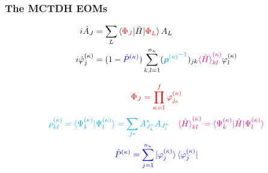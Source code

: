 \documentclass{beamer}
\begin{document}
\begin{frame}
  \frametitle{The MCTDH EOMs}
 \vspace{-.3cm}
\begin{block}{}
\begin{align}
\begin{split}
i\dot{A}_J &= \sum_L \braket{\textcolor{red}{\Phi_J}|\hat{H}|\textcolor{red}{\Phi_L}}A_L \\
i\dot{\varphi}^{(\kappa)}_j &= (1 - \textcolor{blue}{\hat{P}^{(\kappa)}})\sum_{k,l=1}^{n_{\kappa}}(\textcolor{cyan}{{\bm{\rho}^{(\kappa)}}^{-1}})_{jk}\textcolor{magenta}{\braket{\hat{H}}_{kl}^{(\kappa)}}\varphi^{(\kappa)}_l
\label{mctdh_eom}
\end{split}	
\end{align}
\end{block}
 \vspace{-.35cm}
\begin{equation}
\textcolor{red}{\Phi_J = \prod_{\kappa=1}^f\varphi_{j_{\kappa}}^{(\kappa)}}
\end{equation}
\begin{equation}
\textcolor{cyan}{\rho_{kl}^{(\kappa)} = \braket{\Psi_k^{(\kappa)}|\Psi_l^{(\kappa)}}  = \sum_{J^{\kappa}}A_{J_{k}^{\kappa}}^*A_{J_{l}^{\kappa}}} \quad \textcolor{magenta}{\braket{\hat{H}}_{kl}^{(\kappa)} = \braket{\Psi_k^{(\kappa)}|\hat{H}|\Psi_l^{(\kappa)}}}
\end{equation}
\begin{equation}
	\textcolor{blue}{\hat{P}^{(\kappa)} = \sum_{j=1}^{n_{\kappa}}\ket{\varphi_j^{(\kappa)}}\bra{\varphi_j^{(\kappa)}}}
\end{equation}

\end{frame}
\end{document}
